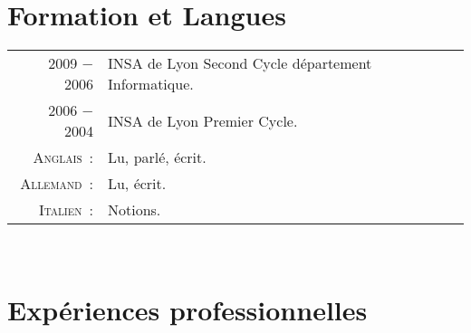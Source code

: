 \documentclass[a4paper,10pt]{article}
\begin{document}
\section{Formation et Langues}
\begin{tabular}{rl}
  2009 − 2006  & INSA de Lyon Second Cycle département Informatique. \\
  2006 − 2004  & INSA de Lyon Premier Cycle. \\
  \textsc{Anglais :}    & Lu, parlé, écrit. \\
  \textsc{Allemand :}   & Lu, écrit. \\
  \textsc{Italien :}    & Notions. \\
\end{tabular} \\

\section{Expériences professionnelles}
\end{document}
